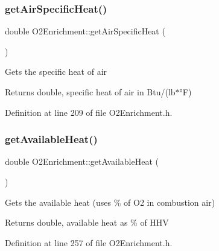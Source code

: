 \mbox{\label{class_o2_enrichment_a435552fca78d0648dddaf406e250e9b6}} 
\subsubsection{\texorpdfstring{get\+Air\+Specific\+Heat()}{getAirSpecificHeat()}}
{\footnotesize\ttfamily double O2\+Enrichment\+::get\+Air\+Specific\+Heat (\begin{DoxyParamCaption}{ }\end{DoxyParamCaption})\hspace{0.3cm}{\ttfamily [inline]}}

Gets the specific heat of air \begin{DoxyReturn}{Returns}
double, specific heat of air in Btu/(lb$\ast$°F) 
\end{DoxyReturn}


Definition at line 209 of file O2\+Enrichment.\+h.

\mbox{\label{class_o2_enrichment_ac34e93c7e1444ab81a621428f0eee4d3}} 
\subsubsection{\texorpdfstring{get\+Available\+Heat()}{getAvailableHeat()}}
{\footnotesize\ttfamily double O2\+Enrichment\+::get\+Available\+Heat (\begin{DoxyParamCaption}{ }\end{DoxyParamCaption})\hspace{0.3cm}{\ttfamily [inline]}}

Gets the available heat (uses \% of O2 in combustion air) \begin{DoxyReturn}{Returns}
double, available heat as \% of H\+HV 
\end{DoxyReturn}


Definition at line 257 of file O2\+Enrichment.\+h.

\mbox{\label{class_o2_enrichment_afc7f9ea349f338ead76255218769a3e3}} 
